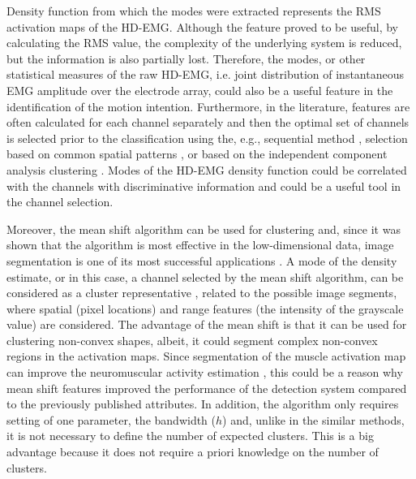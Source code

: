 Density function from which the modes were extracted represents the RMS activation maps of the HD-EMG. Although the feature proved to be useful, by calculating the RMS value, the complexity of the underlying system is reduced, but the information is also partially lost. Therefore, the modes, or other statistical measures of the raw HD-EMG, i.e. joint distribution of instantaneous EMG amplitude over the electrode array, could also be a useful feature in the identification of the motion intention. Furthermore, in the literature, features are often calculated for each channel separately and then the optimal set of channels is selected prior to the classification using the, e.g., sequential method \citep{Hargrove2009, Li2017}, selection based on common spatial patterns \citep{Geng2014}, or based on the independent component analysis clustering \citep{Naik2016}. Modes of the HD-EMG density function could be correlated with the channels with discriminative information and could be a useful tool in the channel selection.

Moreover, the mean shift algorithm can be used for clustering and, since it was shown that the algorithm is most effective in the low-dimensional data, image segmentation is one of its most successful applications \citep{Comaniciu2002}. A mode of the density estimate, or in this case, a channel selected by the mean shift algorithm, can be considered as a cluster representative \citep{Hennig2015}, related to the possible image segments, where spatial (pixel locations) and range features (the intensity of the grayscale value) are considered. The advantage of the mean shift is that it can be used for clustering non-convex shapes, albeit, it could segment complex non-convex regions in the activation maps. Since segmentation of the muscle activation map can improve the neuromuscular activity estimation \citep{Vieira2010}, this could be a reason why mean shift features improved the performance of the detection system compared to the previously published attributes. In addition, the algorithm only requires setting of one parameter, the bandwidth ($h$) and, unlike in the similar methods, it is not necessary to define the number of expected clusters. This is a big advantage because it does not require a priori knowledge on the number of clusters.

